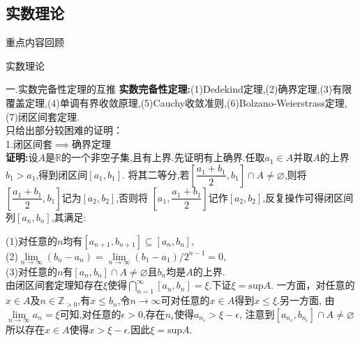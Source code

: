 \documentclass[UTF8]{ctexbeamer}
\begin{document}
    \subsection{实数理论}
    \begin{frame}
        \begin{block}{\begin{center}重点内容回顾\end{center}}
            \begin{center}
                \Huge{实数理论}
            \end{center}
        \end{block}
    \end{frame}
    \begin{frame}{一.实数完备性定理的互推}
        \textbf{实数完备性定理:}(1)Dedekind定理,(2)确界定理,(3)有限覆盖定理,(4)单调有界收敛原理,(5)Cauchy收敛准则,(6)Bolzano-Weierstrass定理,(7)闭区间套定理.
        \\只给出部分较困难的证明：
        \\1.闭区间套$\implies$确界定理
        \pause
        \\\textbf{证明:}设$A$是$\mathbb{R}$的一个非空子集,且有上界.先证明有上确界.任取$a_1\in A$并取$A$的上界$b_1>a_1$,得到闭区间$\left[a_1,b_1\right]$.
        将其二等分,若$\left[\dfrac{a_1+b_1}{2},b_1\right]\cap A\neq\varnothing$,则将$\left[\dfrac{a_1+b_1}{2},b_1\right]$记为$\left[a_2,b_2\right]$,否则将
        $\left[a_1,\dfrac{a_1+b_1}{2}\right]$记作$[a_2,b_2]$,反复操作可得闭区间列${[a_n,b_n]}$,其满足:
    \end{frame}
    \begin{frame}
        (1)对任意的$n$均有$\left[a_{n+1},b_{n+1}\right]\subseteq[a_n,b_n]$,
        \\(2)$\lim\limits_{n\to\infty}(b_n-a_n)=\lim\limits_{n\to\infty}(b_1-a_1)/2^{n-1}=0$,
        \\(3)对任意的$n$有$[a_n,b_n]\cap A\neq\varnothing$且$b_n$均是$A$的上界.
        \\由闭区间套定理知存在$\xi$使得$\bigcap\limits_{n=1}^{\infty}[a_n,b_n]={\xi}$.下证$\xi=\mathrm{sup}A$.
        \indent 一方面，对任意的$x\in A$及$n\in\mathbb{Z}_{>0}$,有$x\leqslant b_n$,令$n\to\infty$可对任意的$x\in A$得到$x\leqslant\xi$.另一方面,
        由$\lim\limits_{n\to\infty}a_n=\xi$可知,对任意的$\epsilon>0$,存在$n_{\epsilon}$使得$a_{n_{\epsilon}}>\xi-\epsilon$,
        注意到$[a_{n_{\epsilon}},b_{n_\epsilon}]\cap A\neq\varnothing$所以存在$x\in A$使得$x>\xi-\epsilon$.因此$\xi=\mathrm{sup}A$.
    \end{frame}
\end{document}
